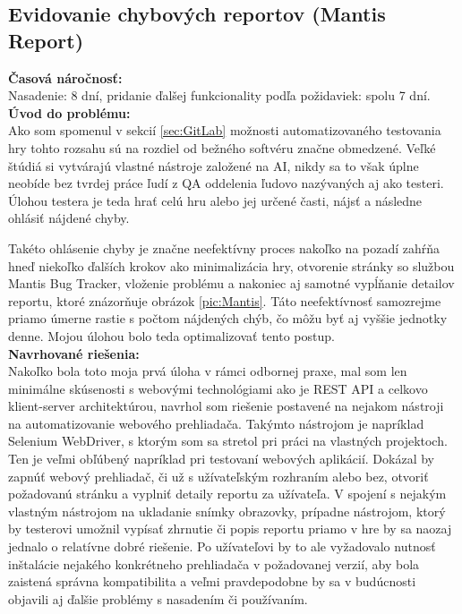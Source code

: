 \documentclass[slovak,bachelorpractice]{diploma}
\begin{document}
\subsection{Evidovanie chybových reportov (Mantis Report)}
\label{sec:Report}
\textbf{Časová náročnosť:} \\ Nasadenie: 8 dní, pridanie ďalšej funkcionality podľa požidaviek: spolu 7 dní.\\
\textbf{Úvod do problému:} \\ Ako som spomenul v sekcií \ref{sec:GitLab} možnosti automatizovaného testovania hry tohto rozsahu sú na rozdiel od bežného softvéru značne obmedzené. Veľké štúdiá si vytvárajú vlastné nástroje založené na AI, nikdy sa to však úplne neobíde bez tvrdej práce ľudí z QA oddelenia ľudovo nazývaných aj ako testeri. Úlohou testera je teda hrať celú hru alebo jej určené časti, nájsť a následne ohlásiť nájdené chyby. 

Takéto ohlásenie chyby je značne neefektívny proces nakoľko na pozadí zahŕňa hneď niekoľko ďalších krokov ako minimalizácia hry, otvorenie stránky so službou Mantis Bug Tracker, vloženie problému a nakoniec aj samotné vypĺňanie detailov reportu, ktoré znázorňuje obrázok \ref{pic:Mantis}.
Táto neefektívnosť samozrejme priamo úmerne rastie s počtom nájdených chýb, čo môžu byť aj vyššie jednotky denne. Mojou úlohou bolo teda optimalizovať tento postup. \\
\textbf{Navrhované riešenia:} \\ Nakoľko bola toto moja prvá úloha v rámci odbornej praxe, mal som len minimálne skúsenosti s webovými technológiami ako je REST API a celkovo klient-server architektúrou, navrhol som riešenie postavené na nejakom nástroji na automatizovanie webového prehliadača. Takýmto nástrojom je napríklad Selenium WebDriver, s ktorým som sa stretol pri práci na vlastných projektoch. Ten je veľmi obľúbený napríklad pri testovaní webových aplikácií. Dokázal by zapnúť webový prehliadač, či už s užívateľským rozhraním alebo bez, otvoriť požadovanú stránku a vyplniť detaily reportu za užívateľa. V spojení s nejakým vlastným nástrojom na ukladanie snímky obrazovky, prípadne nástrojom, ktorý by testerovi umožnil vypísať zhrnutie či popis reportu priamo v hre by sa naozaj jednalo o relatívne dobré riešenie. Po užívateľovi by to ale vyžadovalo nutnosť inštalácie nejakého konkrétneho prehliadača v požadovanej verzií, aby bola zaistená správna kompatibilita a veľmi pravdepodobne by sa v budúcnosti objavili aj ďalšie problémy s nasadením či používaním. 
\end{document}
